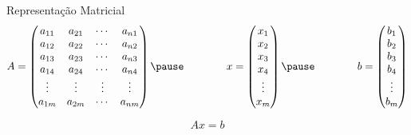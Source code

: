 \documentclass[fleqn,aspectratio=169,12pt]{beamer}
\begin{document}
\begin{frame}{Representação Matricial}
  \[
    A = \begin{pmatrix}
      a_{11} & a_{21} & \cdots & a_{n1} \\
      a_{12} & a_{22} & \cdots & a_{n2} \\
      a_{13} & a_{23} & \cdots & a_{n3} \\
      a_{14} & a_{24} & \cdots & a_{n4} \\
      \vdots & \vdots & \vdots & \vdots \\
      a_{1m} & a_{2m} & \cdots & a_{nm}
    \end{pmatrix}
    \pause
    \qquad\qquad
    x = \begin{pmatrix}
      x_1    \\
      x_2    \\
      x_3    \\
      x_4    \\
      \vdots \\
      x_m
    \end{pmatrix}
    \pause
    \qquad\qquad
    b = \begin{pmatrix}
      b_1    \\
      b_2    \\
      b_3    \\
      b_4    \\
      \vdots \\
      b_m
    \end{pmatrix}
  \]

  \pause
  \bigskip
  \[
    Ax = b
  \]
\end{frame}

%
%

\end{document}
